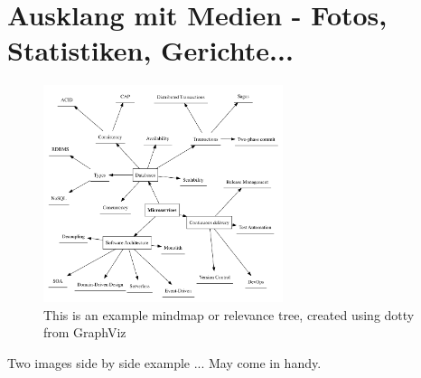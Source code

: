 \section{Ausklang mit Medien - Fotos, Statistiken, Gerichte...}
\lipsum[14] %
\begin{figure}[H]
	\centering
	\includegraphics[width=70mm]{relevance-tree_map-mindmap.png}
	\caption{This is an example mindmap or relevance tree, created using dotty from GraphViz}
\end{figure}
\lipsum[15-17] %
Two images side by side example ... May come in handy.
